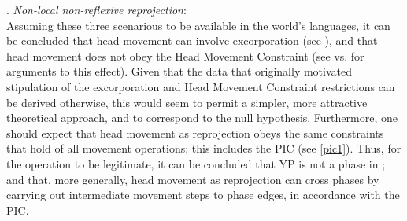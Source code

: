 \documentclass[output=paper
,modfonts
,nonflat]{langsci/langscibook}
\begin{document}
\Lsciex. {\it Non-local \label{25}non-reflexive reprojection}:\\

Assuming these three scenarious to be available in the world's
languages, it can be concluded that head movement can involve
excorporation (see \cite{Roberts:91,Roberts:97:res}), and that head
movement does not obey the Head Movement Constraint (see
\cite{Roberts:09:hea,Roberts:10} vs. \cite{Travis:84} for arguments to
this effect). Given that the data that originally motivated
stipulation of the excorporation and Head Movement Constraint
restrictions can be derived otherwise, this would seem to permit a
simpler, more attractive theoretical approach, and to correspond to
the null hypothesis. Furthermore, one should expect that head movement
as reprojection obeys the same constraints that hold of all movement
operations; this includes the PIC (see \ref{pic1}). Thus, for the
operation to be legitimate, it can be concluded that YP is not a phase
in \Last; and that, more generally, head movement as reprojection can
cross phases by carrying out intermediate movement steps to phase
edges, in accordance with the PIC.
\end{document}
